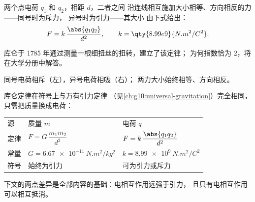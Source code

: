 \begin{theorem}[库仑定律]\label{thm:g11:fundamental-interactions:coulomb}
两个点电荷 $q_1$ 和 $q_2$，相距 $d$，二者之间
沿连线相互施加大小相等、方向相反的力——同号时为斥力，
异号时为引力——其大小
由下式给出：
\[
F = k\,\frac{\abs{q_1 q_2}}{d^{2}},
\qquad k = \qty{8.99e9}{N.m^2/C^2}.
\]
\end{theorem}
\admitted

\begin{remark}\label{rem:g11:fundamental-interactions:torsion}
库仑于 1785 年通过测量一根细扭丝的扭转，建立了该定律；
为何指数恰为 $2$，将在大学分册中解答。
\end{remark}

\begin{omfigure}
\qquad
{}

{\small 同号电荷相斥（左），异号电荷相吸（右）；
两力大小始终相等、方向相反。}
\end{omfigure}

\begin{remark}[与引力的形式对应]\label{rem:g11:fundamental-interactions:twin}
库仑定律在符号上与万有引力定律
（见\cref{ch:g10:universal-gravitation}）完全相同，只需把质量换成电荷：
\begin{center}
\begin{tabular}{lll}
源 & 质量 $m$ & 电荷 $q$ \\
定律 & $F = G\,\dfrac{m_1 m_2}{d^2}$ & $F = k\,\dfrac{\abs{q_1 q_2}}{d^2}$ \\[1.5ex]
常量 & $G = \qty{6.67e-11}{N.m^2/kg^2}$ & $k = \qty{8.99e9}{N.m^2/C^2}$ \\
符号 & 始终为引力 & 可为引力或斥力 \\
\end{tabular}
\end{center}
下文的两点差异是全部内容的基础：电相互作用远强于引力，
且只有电相互作用可以相互抵消。
\end{remark}

